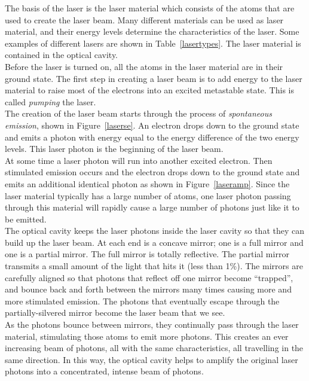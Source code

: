 The basis of the laser is the laser material which consists of the atoms that are used to create the laser beam. Many different materials can be used as laser material, and their energy levels determine the characteristics of the laser. Some examples of different lasers are shown in Table~\ref{lasertypes}. The laser material is contained in the optical cavity.\\ 
 
Before the laser is turned on, all the atoms in the laser material are in their ground state. The first step in creating a laser beam is to add energy to the laser material to raise most of the electrons into an excited metastable state. This is called \textit{pumping} the laser. \\ 

The creation of the laser beam starts through the process of \textit{spontaneous emission}, shown in Figure~\ref{laserse}. An electron drops down to the ground state and emits a photon with energy equal to the energy difference of the two energy levels. This laser photon is the beginning of the laser beam.\\

At some time a laser photon will run into another excited electron. Then stimulated emission occurs and the electron drops down to the ground state and emits an additional identical photon as shown in Figure~\ref{laseramp}. Since the laser material typically has a large number of atoms, one laser photon passing through this material will rapidly cause a large number of photons just like it to be emitted.\\
 
The optical cavity keeps the laser photons inside the laser cavity so that they can build up the laser beam. At each end is a concave mirror; one is a full mirror and one is a partial mirror. The full mirror is totally reflective. The partial mirror transmits a small amount of the light that hits it (less than 1\%). The mirrors are carefully aligned so that photons that reflect off one mirror become ``trapped'', and bounce back and forth between the mirrors many times causing more and more stimulated emission. The photons that eventually escape through the partially-silvered mirror become the laser beam that we see.\\
 
As the photons bounce between mirrors, they continually pass through the laser material, stimulating those atoms to emit more photons.  This creates an ever increasing beam of photons, all with the same characteristics, all travelling in the same direction.  In this way, the optical cavity helps to amplify the original laser photons into a concentrated, intense beam of photons.\\

